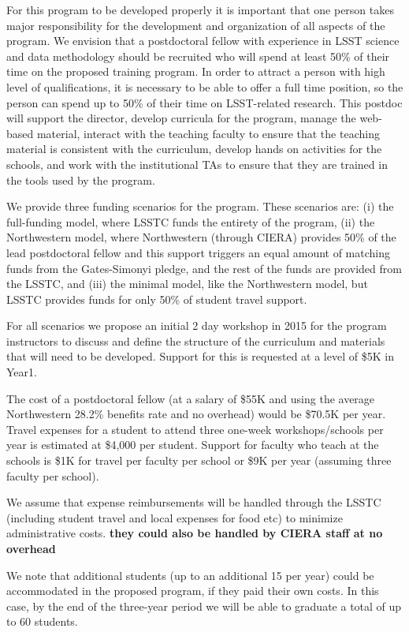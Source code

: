 \documentclass[nofootbib,floatfix,11pt]{article}
\begin{document}
For this program to be developed properly it is important that one person takes major responsibility for the development and organization of all aspects of the program. We envision that a postdoctoral fellow with experience in LSST science and data methodology should be recruited who will spend at least 50\% of their time on the proposed training program. In order to attract a person with high level of qualifications, it is necessary to be able to offer a full time position, so the person can spend up to 50\% of their time on LSST-related research. This postdoc will support the director, develop curricula for the program, manage the web-based material, interact with the teaching faculty to ensure that the teaching material is consistent with the curriculum, develop hands on activities for the schools, and work with the institutional TAs to ensure that they are trained in the tools used by the program.

We provide three funding scenarios for the program. These scenarios are: (i) the full-funding model, where LSSTC funds the entirety of the  program, (ii) the Northwestern model, where Northwestern (through CIERA) provides 50\% of the lead postdoctoral fellow and this support triggers an equal amount of matching funds from the Gates-Simonyi pledge, and the rest of the funds are provided from the LSSTC, and (iii) the minimal model, like the Northwestern model, but LSSTC provides funds for only 50\% of student travel support. 

For all scenarios we propose an initial 2 day workshop in 2015 for the program instructors to discuss and define the structure of the curriculum and materials that will need to be developed. Support for this is requested at a level of \$5K in Year1.

The cost of a postdoctoral fellow (at a salary of \$55K and using the average Northwestern 28.2\% benefits rate and no overhead) would be \$70.5K per year. Travel expenses for a student to attend three one-week workshops/schools per year is estimated at \$4,000 per student. Support for faculty who teach at the schools is \$1K for travel per faculty per school or \$9K per year (assuming three faculty per school).

We assume that expense reimbursements will be handled through the LSSTC (including student travel and local expenses for food etc) to minimize administrative costs. {\bf they could also be handled by CIERA staff at no overhead} 

We note that additional students (up to an additional 15 per year) could be accommodated in the proposed program, if they paid their own costs. In this case, by the end of the three-year period we will be able to graduate a total of up to 60 students. 
\end{document}

